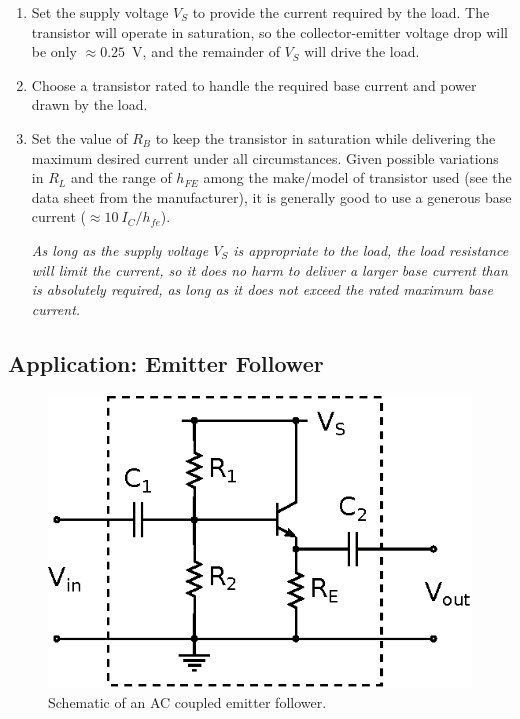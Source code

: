 \documentclass[11pt]{article}
\begin{document}
\begin{enumerate}
\item Set the supply voltage $V_S$ to provide the current required by
  the load. The transistor will operate in saturation, so the
  collector-emitter voltage drop will be only $\approx 0.25$~V, and
  the remainder of $V_S$ will drive the load.

\item Choose a transistor rated to handle the required base current
  and power drawn by the load.
  
\item Set the value of $R_B$ to keep the transistor in saturation
  while delivering the maximum desired current under all
  circumstances. Given possible variations in $R_L$ and the range of
  $h_{FE}$ among the make/model of transistor used (see the data sheet
  from the manufacturer), it is generally good to use a generous base
  current ($\approx 10~I_C/h_{fe}$).

  \emph{As long as the supply voltage $V_S$ is appropriate to the
  load, the load resistance will limit the current, so it does no harm
  to deliver a larger base current than is absolutely required, as
  long as it does not exceed the rated maximum base current.}
\end{enumerate}

\subsection{Application: Emitter Follower}
\label{sec:emitterfollower}

\begin{figure}[ht]
  \begin{center}
    \includegraphics{emitterfollower.eps}
    \caption{Schematic of an AC coupled emitter follower.}
    \label{fig:emitterfollower}
  \end{center}
\end{figure}
\end{document}
